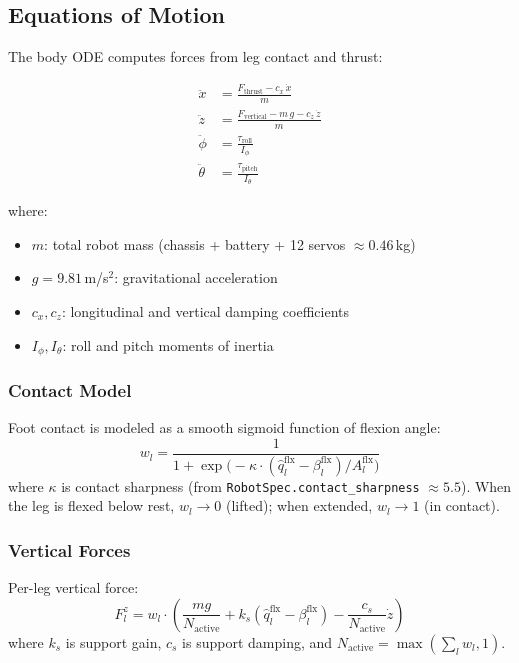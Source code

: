 \documentclass[11pt]{article}
\begin{document}
\subsection{Equations of Motion}

The body ODE computes forces from leg contact and thrust:

\begin{align}
\ddot{x} &= \frac{F_{\mathrm{thrust}} - c_x\,\dot{x}}{m} \label{eq:x-ddot} \\
\ddot{z} &= \frac{F_{\mathrm{vertical}} - m\,g - c_z\,\dot{z}}{m} \label{eq:z-ddot} \\
\ddot{\phi} &= \frac{\tau_{\mathrm{roll}}}{I_\phi} \label{eq:roll-ddot} \\
\ddot{\theta} &= \frac{\tau_{\mathrm{pitch}}}{I_\theta} \label{eq:pitch-ddot}
\end{align}

where:
\begin{itemize}
    \item $m$: total robot mass (chassis + battery + 12 servos $\approx 0.46$\,kg)
    \item $g = 9.81$\,m/s$^2$: gravitational acceleration
    \item $c_x, c_z$: longitudinal and vertical damping coefficients
    \item $I_\phi, I_\theta$: roll and pitch moments of inertia
\end{itemize}

\subsubsection{Contact Model}

Foot contact is modeled as a smooth sigmoid function of flexion angle:
\begin{equation}
w_l = \frac{1}{1 + \exp\!\bigl(-\kappa\cdot(\hat{q}_l^{\mathrm{flx}} - \beta_l^{\mathrm{flx}})/A_l^{\mathrm{flx}}\bigr)}
\label{eq:contact}
\end{equation}
where $\kappa$ is contact sharpness (from \texttt{RobotSpec.contact\_sharpness} $\approx 5.5$). When the leg is flexed below rest, $w_l\to 0$ (lifted); when extended, $w_l\to 1$ (in contact).

\subsubsection{Vertical Forces}

Per-leg vertical force:
\begin{equation}
F_l^z = w_l \cdot \left(\frac{mg}{N_{\mathrm{active}}} + k_s(\hat{q}_l^{\mathrm{flx}} - \beta_l^{\mathrm{flx}}) - \frac{c_s}{N_{\mathrm{active}}}\dot{z}\right)
\label{eq:vert-force}
\end{equation}
where $k_s$ is support gain, $c_s$ is support damping, and $N_{\mathrm{active}}=\max(\sum_l w_l, 1)$.
\end{document}
